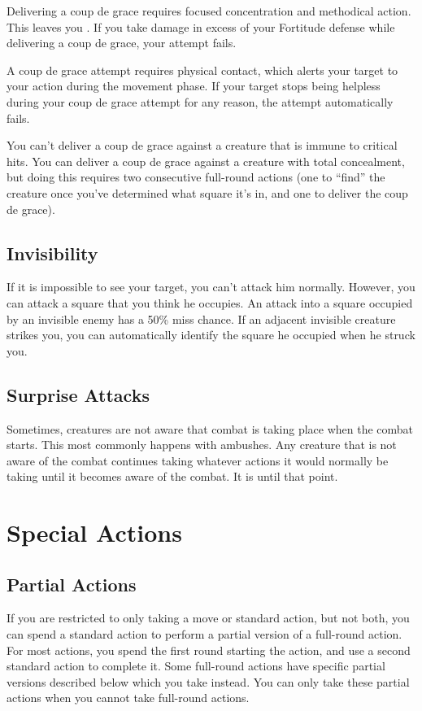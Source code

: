         Delivering a coup de grace requires focused concentration and methodical action. This leaves you . If you take damage in excess of your Fortitude defense while delivering a coup de grace, your attempt fails.

        A coup de grace attempt requires physical contact, which alerts your target to your action during the movement phase. If your target stops being helpless during your coup de grace attempt for any reason, the attempt automatically fails.

        You can't deliver a coup de grace against a creature that is immune to critical hits. You can deliver a coup de grace against a creature with total concealment, but doing this requires two consecutive full-round actions (one to ``find'' the creature once you've determined what square it's in, and one to deliver the coup de grace).

    \subsection{Invisibility}\label{Invisibility}
        If it is impossible to see your target, you can't attack him normally. However, you can attack a square that you think he occupies. An attack into a square occupied by an invisible enemy has a 50\% miss chance. If an adjacent invisible creature strikes you, you can automatically identify the square he occupied when he struck you.

    \subsection{Surprise Attacks}\label{Surprise Attacks}
        Sometimes, creatures are not aware that combat is taking place when the combat starts. This most commonly happens with ambushes. Any creature that is not aware of the combat continues taking whatever actions it would normally be taking until it becomes aware of the combat. It is \unaware until that point.

\section{Special Actions}

    \subsection{Partial Actions}

        If you are restricted to only taking a move or standard action, but not both, you can spend a standard action to perform a partial version of a full-round action. For most actions, you spend the first round starting the action, and use a second standard action to complete it. Some full-round actions have specific partial versions described below which you take instead. You can only take these partial actions when you cannot take full-round actions.

